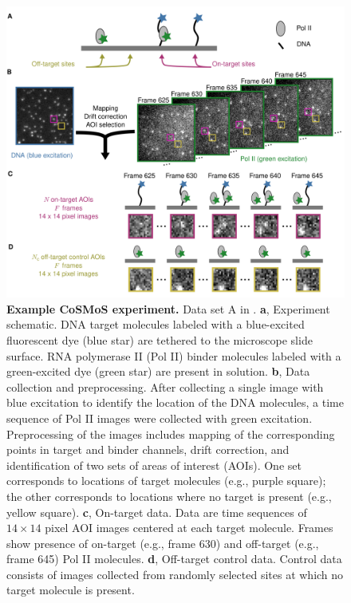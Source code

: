 \begin{figure}
\begin{fullwidth}
\centering
\includegraphics[width=145mm]{figures/figure1/figure1.png}
\caption{\textbf{Example CoSMoS experiment.} Data set A in . \textbf{a}, Experiment schematic. DNA target molecules labeled with a blue-excited fluorescent dye (blue star) are tethered to the microscope slide surface. RNA polymerase II (Pol II) binder molecules labeled with a green-excited dye (green star) are present in solution. \textbf{b}, Data collection and preprocessing. After collecting a single image with blue excitation to identify the location of the DNA molecules, a time sequence of Pol II images were collected with green excitation.  Preprocessing of the images includes mapping of the corresponding points in target and binder channels, drift correction, and identification of two sets of areas of interest (AOIs).  One set corresponds to locations of target molecules (e.g., purple square); the other corresponds to locations where no target is present (e.g., yellow square). \textbf{c}, On-target data. Data are time sequences of $14 \times 14$ pixel AOI images centered at each target molecule. Frames show presence of on-target (e.g., frame 630) and off-target (e.g., frame 645) Pol II molecules. \textbf{d}, Off-target control data. Control data consists of images collected from randomly selected sites at which no target molecule is present. }
\label{fig:cosmos_experiment}
\end{fullwidth}
\end{figure}